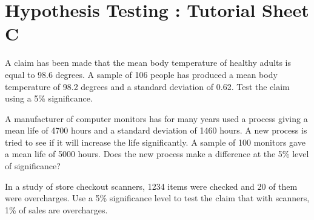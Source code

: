 \documentclass[a4paper,12pt]{article}
\begin{document}
\section*{Hypothesis Testing : Tutorial Sheet C}
\item  
A claim has been made that the mean body temperature of healthy adults is equal to 98.6 degrees. 
A sample of 106 people has produced a mean body temperature of 98.2 degrees and a standard deviation of 0.62. Test the claim using a 5\% significance.

\item 
A manufacturer of computer monitors  has for many years used a process giving a mean life of 4700 hours and a standard deviation of 1460 hours. 
A new process is tried to see if it will increase the life significantly. A sample of 100 monitors gave a mean life of 5000 hours.  
Does the new process make a difference at the 5\% level of significance?

\item In a study of store checkout scanners, 1234 items were checked and 20 of them were overcharges.
Use a 5\% significance level to test the claim that with scanners, 1\% of sales are overcharges.
\end{document}

